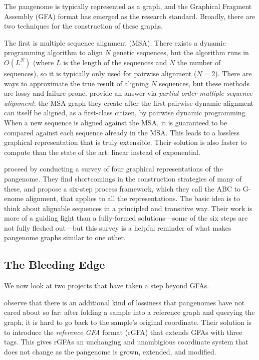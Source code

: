 \documentclass[acmsmall, screen]{acmart}
\begin{document}
The pangenome is typically represented as a graph, and the
Graphical Fragment Assembly (GFA) format \cite{gfa} has 
emerged as the research standard.
Broadly, there are two techniques for the construction of these graphs. 

The first is multiple sequence alignment (MSA).
There exists a dynamic programming algorithm to align $N$ genetic sequences, 
but the algorithm runs in $O(L^N)$ (where $L$ is the length of the 
sequences and $N$ the number of sequences), so it is typically only used 
for pairwise alignment ($N=2$). There are ways to approximate the true result of
aligning $N$ sequences, but these methods are lossy and failure-prone.
\citet{poa} provide an answer via \emph{partial order mutliple sequence 
alignment}: the MSA graph they create after the first pairwise dynamic 
alignment can itself be aligned, as a first-class citizen,
by pairwise dynamic programming.
When a new sequence is aligned against the MSA, it is guaranteed to be compared
against each sequence already in the MSA. This leads to a lossless graphical
representation that is truly extensible. 
Their solution is also faster to compute 
than the state of the art: linear instead of exponential.

\citet{genome_alignment} proceed by conducting a survey of four graphical 
representations of the pangenome. They find shortcomings in the construction
strategies of many of these, and propose a six-step process framework, 
which they call the ABC to G-enome alignment, that applies to all the 
representations. The basic idea is to think about alignable sequences in a 
principled and transitive way. Their work is more of a guiding light than a 
fully-formed solutions---some of the six steps are not fully fleshed out---but
this survey is a helpful reminder of what makes pangenome graphs similar to 
one other.

\subsection{The Bleeding Edge}

We now look at two projects that have taken a step beyond GFAs.

\citet{minigraph} observe that there is an additional kind of lossiness
that pangenomes have not cared about so far: after folding a sample into a 
reference graph and querying the graph, it is hard to go back to the 
sample's original coordinate. Their solution is to introduce the 
\emph{reference GFA} format (rGFA) that extends GFAs with three tags.
This gives rGFAs an unchanging and unambigious coordinate system that does not
change as the pangenome is grown, extended, and modified. 
\end{document}
